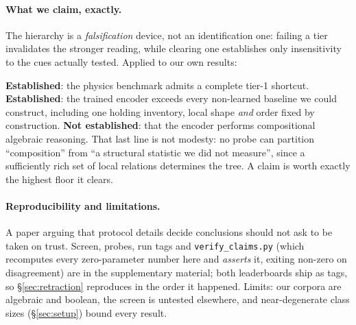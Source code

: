 \paragraph{What we claim, exactly.} The hierarchy is a \emph{falsification} device, not an
identification one: failing a tier invalidates the stronger reading, while clearing one establishes
only insensitivity to the cues actually tested. Applied to our own results:

\textbf{Established}: the physics benchmark admits a complete tier-1 shortcut. \textbf{Established}:
the trained encoder exceeds every non-learned baseline we could construct, including one holding
inventory, local shape \emph{and} order fixed by construction. \textbf{Not established}: that the
encoder performs compositional algebraic reasoning. That last line is not modesty: no probe can
partition ``composition'' from ``a structural statistic we did not measure'', since a sufficiently
rich set of local relations determines the tree. A claim is worth exactly the highest floor it clears.

\paragraph{Reproducibility and limitations.} A paper arguing that protocol details decide conclusions
should not ask to be taken on trust. Screen, probes, run tags and \texttt{verify\_claims.py} (which
recomputes every zero-parameter number here and \emph{asserts} it, exiting non-zero on disagreement)
are in the supplementary material; both leaderboards ship as tags, so
\S\ref{sec:retraction} reproduces in the order it happened. Limits: our corpora are algebraic and
boolean, the screen is untested elsewhere, and near-degenerate class sizes (\S\ref{sec:setup}) bound
every result.
